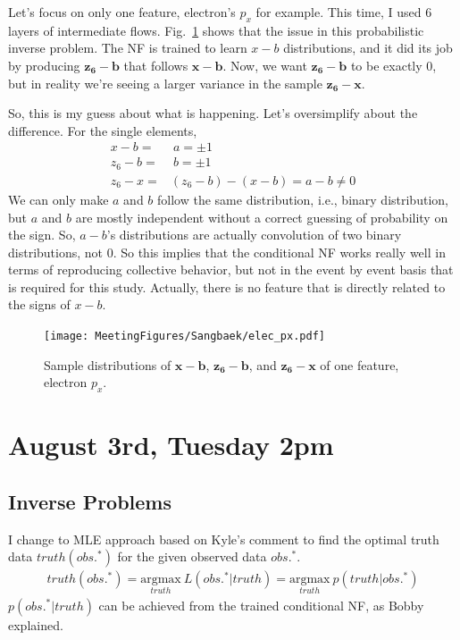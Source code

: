 Let's focus on only one feature, electron's $p_x$ for example. This time, I used 6 layers of intermediate flows. Fig.~\ref{fig:electron_px} shows that the issue in this probabilistic inverse problem.
The NF is trained to learn $x-b$ distributions, and it did its job by producing $\mathbf{z_6}-\mathbf{b}$ that follows $\mathbf{x}-\mathbf{b}$. Now, we want $\mathbf{z_6}-\mathbf{b}$ to be exactly 0, but in reality we're seeing a larger variance in the sample $\mathbf{z_6}-\mathbf{x}$.

So, this is my guess about what is happening. Let's oversimplify about the difference. For the single elements,
\begin{align}
    x -b =& ~a = \pm 1\\
    z_6-b =& ~b = \pm 1\\
    z_6 -x =& (z_6-b) - (x-b) = a- b \neq 0
\end{align}
We can only make $a$ and $b$ follow the same distribution, i.e., binary distribution, but $a$ and $b$ are mostly independent without a correct guessing of probability on the sign. So, $a-b$'s distributions are actually convolution of two binary distributions, not 0. So this implies that the conditional NF works really well in terms of reproducing collective behavior, but not in the event by event basis that is required for this study. Actually, there is no feature that is directly related to the signs of $x-b$.


\begin{figure}[!ht]
    \centering
    \texttt{[image: MeetingFigures/Sangbaek/elec\_px.pdf]}
    \caption{Sample distributions of $\mathbf{x}-\mathbf{b}$, $\mathbf{z_6}-\mathbf{b}$, and $\mathbf{z_6}-\mathbf{x}$ of one feature, electron $p_x$.}
    \label{fig:electron_px}
\end{figure}

\clearpage
\section{August 3rd, Tuesday 2pm}
\subsection{Inverse Problems}

I change to MLE approach based on Kyle's comment to find the optimal truth data $truth(obs.^{*})$ for the given observed data $obs.^{*}$. 
\begin{align}
truth(obs.^{*}) = \underset{truth}{\text{argmax}}~ L(obs.^{*}|truth) = \underset{truth}{\text{argmax}}~ p(truth|obs.^{*}) 
\end{align}
$p(obs.^{*}|truth)$ can be achieved from the trained conditional NF, as Bobby explained.

